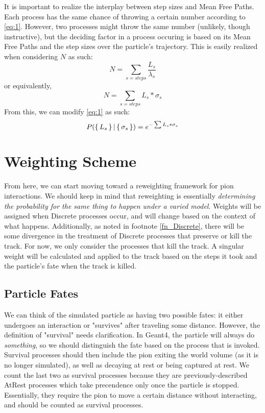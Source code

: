 \documentclass[12pt]{article}
\begin{document}
It is important to realize the interplay between step sizes and Mean Free Paths. Each process has the same chance of throwing a certain number according to \eqref{eq:1}. However, two processes might throw the same number (unlikely, though instructive), but the deciding factor in a process occuring is based on its Mean Free Paths and the step sizes over the particle's trajectory. This is easily realized when considering $N$ as such:
\begin{equation}\label{eq:3}
N = \sum\limits_{s={steps}} \frac{L_{s}}{\lambda_{s}}
\end{equation}
or equivalently,
\begin{equation}\label{eq:4}
N = \sum\limits_{s={steps}} L_{s} * \sigma_{s}
\end{equation}
From this, we can modify \ref{eq:1} as such:
\begin{equation}\label{eq:5}
P(\set{L_s} | \set{\sigma_s}) = e^{-\sum L_s * \sigma_s}
\end{equation}




\section{Weighting Scheme}
From here, we can start moving toward a reweighting framework for pion interactions. We should keep in mind that reweighting is essentially \textit{determining the probability for the same thing to happen under a varied model}. Weights will be assigned when Discrete processes occur, and will change based on the context of what happens. Additionally, as noted in footnote \ref{fn_Discrete}, there will be some divergence in the treatment of Discrete processes that preserve or kill the track. For now, we only consider the processes that kill the track. A singular weight   will be calculated and applied to the track based on the steps it took and the particle's fate when the track is killed.

\subsection{Particle Fates}

We can think of the simulated particle as having two possible fates: it either undergoes an interaction or "survives" after traveling some distance. However, the definition of "survival" needs clarification. In Geant4, the particle will always do \textit{something}, so we should distinguish the fate based on the process that is invoked. Survival processes should then include the pion exiting the world volume (as it is no longer simulated), as well as decaying at rest or being captured at rest. We count the last two as survival processes because they are previously-described AtRest processes which take precendence only once the particle is stopped. Essentially, they require the pion to move a certain distance without interacting, and should be counted as survival processes. 
\end{document}
